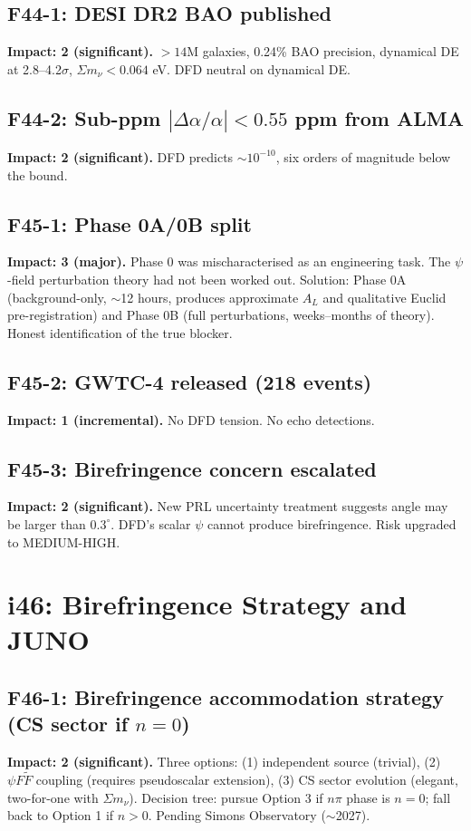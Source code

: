 \documentclass[11pt,a4paper]{article}
\begin{document}
\subsection{F44-1: DESI DR2 BAO published}
\textbf{Impact: 2 (significant).} $>14$M galaxies, 0.24\% BAO precision, dynamical DE at 2.8--4.2$\sigma$, $\Sigma m_\nu < 0.064$ eV. DFD neutral on dynamical DE.

\subsection{F44-2: Sub-ppm $|\Delta\alpha/\alpha| < 0.55$ ppm from ALMA}
\textbf{Impact: 2 (significant).} DFD predicts $\sim 10^{-10}$, six orders of magnitude below the bound.

\subsection{F45-1: Phase 0A/0B split}
\textbf{Impact: 3 (major).} Phase 0 was mischaracterised as an engineering task. The $\psi$-field perturbation theory had not been worked out. Solution: Phase 0A (background-only, $\sim$12 hours, produces approximate $A_L$ and qualitative Euclid pre-registration) and Phase 0B (full perturbations, weeks--months of theory). Honest identification of the true blocker.

\subsection{F45-2: GWTC-4 released (218 events)}
\textbf{Impact: 1 (incremental).} No DFD tension. No echo detections.

\subsection{F45-3: Birefringence concern escalated}
\textbf{Impact: 2 (significant).} New PRL uncertainty treatment suggests angle may be larger than $0.3^\circ$. DFD's scalar $\psi$ cannot produce birefringence. Risk upgraded to MEDIUM-HIGH.

\section{i46: Birefringence Strategy and JUNO}
\label{sec:i46}

\subsection{F46-1: Birefringence accommodation strategy (CS sector if $n=0$)}
\textbf{Impact: 2 (significant).} Three options: (1) independent source (trivial), (2) $\psi F\tilde{F}$ coupling (requires pseudoscalar extension), (3) CS sector evolution (elegant, two-for-one with $\Sigma m_\nu$). Decision tree: pursue Option 3 if $n\pi$ phase is $n = 0$; fall back to Option 1 if $n > 0$. Pending Simons Observatory ($\sim$2027).
\end{document}
